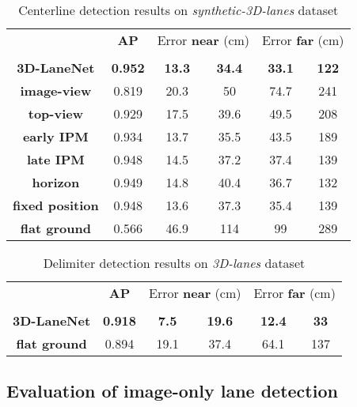 \documentclass[10pt,twocolumn,letterpaper]{article}
\begin{document}
\setlength{\heavyrulewidth}{1.5pt}
\setlength{\abovetopsep}{4pt}
\begin{table}[!htbp]
	\centering
	\caption{Centerline detection results on \emph{synthetic-3D-lanes} dataset}
	\begin{tabular}
		{*6c}
		\toprule
		& \textbf{AP} &   \multicolumn{2}{c}{Error \textbf{near} (cm)} & \multicolumn{2}{c}{Error \textbf{far} (cm)}   \\ 
		&    &  &  &  & \\
		\textbf{3D-LaneNet} & \textbf{0.952}	& \textbf{13.3}& 	\textbf{34.4}& 	\textbf{33.1}& 	\textbf{122}\\
		\textbf{image-view} & 0.819	& 20.3 & 50	& 74.7	& 241  \\ 
		\textbf{top-view} & 0.929 &	17.5 &	39.6 & 49.5 & 208  \\ 
		\textbf{early IPM } & 0.934 & 13.7	 & 35.5 & 43.5 & 189 \\ 
		\textbf{late IPM } & 0.948	&14.5	&37.2	& 37.4	&139  \\ 
		\midrule 
		
		\textbf{horizon} &0.949	&14.8&	40.4&	36.7&	132	  \\ 	
		\textbf{fixed position }	& 0.948	& 13.6	& 37.3	& 35.4	& 139  \\ 	
		\midrule 
		\textbf{flat ground}&0.566	& 46.9 & 114	& 99	& 289  \\ 	
		\bottomrule
	\end{tabular} 	\label{tab:ablation}
\end{table}

\setlength{\heavyrulewidth}{1.5pt}
\setlength{\abovetopsep}{4pt}
\begin{table}[!htbp]
	\centering
	\caption{Delimiter detection results on \emph{3D-lanes} dataset}
	\begin{tabular}
		{*6c}
		\toprule
		& \textbf{AP} &   \multicolumn{2}{c}{Error \textbf{near} (cm)} & \multicolumn{2}{c}{Error \textbf{far} (cm)}   \\ 
		&    &  &  &  & \\
		\textbf{3D-LaneNet} & \textbf{0.918}	& \textbf{7.5}& 	\textbf{19.6}& 	\textbf{12.4}& 	\textbf{33}\\
		\midrule 
		\textbf{flat ground} & 0.894 & 19.1 &	37.4 & 64.1	& 137  \\ 	
		\bottomrule
	\end{tabular} 	\label{tab:real}
\end{table}

\subsection{Evaluation of image-only lane detection}
\end{document}
